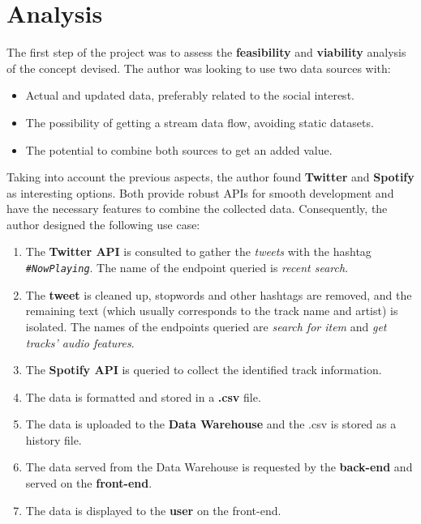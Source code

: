 
\section{Analysis} \label{analysis}

\nonzeroparskip The first step of the project was to assess the \textbf{feasibility} and \textbf{viability} analysis of the concept devised. The author was looking to use two data sources with:

\begin{itemize}
	\item Actual and updated data, preferably related to the social interest.
	\item The possibility of getting a stream data flow, avoiding static datasets.
	\item The potential to combine both sources to get an added value.
\end{itemize}

\nonzeroparskip Taking into account the previous aspects, the author found \textbf{Twitter} and \textbf{Spotify} as interesting options. Both provide robust APIs for smooth development and have the necessary features to combine the collected data. Consequently, the author designed the following use case:

\begin{enumerate}
	\item The \textbf{Twitter API} is consulted to gather the \textit{tweets} with the hashtag \texttt{\textit{\#NowPlaying}}. The name of the endpoint queried is \textit{recent search}.
	\item The \textbf{tweet} is cleaned up, stopwords and other hashtags are removed, and the remaining text (which usually corresponds to the track name and artist) is isolated. The names of the endpoints queried are \textit{search for item} and \textit{get tracks' audio features}.
	\item The \textbf{Spotify API} is queried to collect the identified track information.
	\item The data is formatted and stored in a \textbf{.csv} file.
	\item The data is uploaded to the \textbf{Data Warehouse} and the .csv is stored as a history file.
	\item The data served from the Data Warehouse is requested by the \textbf{back-end} and served on the \textbf{front-end}.
	\item The data is displayed to the \textbf{user} on the front-end.
\end{enumerate}

